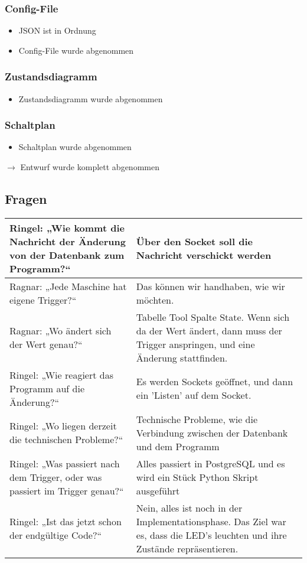\documentclass{scrartcl}
\begin{document}
\subsubsection{Config-File}
\begin{itemize}
	\item JSON ist in Ordnung
	\item Config-File wurde abgenommen
\end{itemize}

\subsubsection{Zustandsdiagramm}
\begin{itemize}
	\item Zustandsdiagramm wurde abgenommen
\end{itemize}

\subsubsection{Schaltplan}
\begin{itemize}
	\item Schaltplan wurde abgenommen
\end{itemize}

$\rightarrow$ Entwurf wurde komplett abgenommen

\subsection{Fragen}
\begin{center}
\begin{tabular}[t]{p{.45\linewidth} p{.45\linewidth}}
Ringel: „Wie kommt die Nachricht der Änderung von der Datenbank zum Programm?“ & Über den Socket soll die Nachricht verschickt werden \\
\hline
Ragnar: „Jede Maschine hat eigene Trigger?“ & Das können wir handhaben, wie wir möchten.\\
\hline
Ragnar: „Wo ändert sich der Wert genau?“ & Tabelle Tool Spalte State. Wenn sich da der Wert ändert, dann muss der Trigger anspringen, und eine Änderung stattfinden.\\
\hline
Ringel: „Wie reagiert das Programm auf die Änderung?“ & Es werden Sockets geöffnet, und dann ein 'Listen' auf dem Socket. \\
\hline
Ringel: „Wo liegen derzeit die technischen Probleme?“ & Technische Probleme, wie die Verbindung zwischen der Datenbank und dem Programm \\
\hline
Ringel: „Was passiert nach dem Trigger, oder was passiert im Trigger genau?“ & Alles passiert in PostgreSQL und es wird ein Stück Python Skript ausgeführt \\
\hline
Ringel: „Ist das jetzt schon der endgültige Code?“ & Nein, alles ist noch in der Implementationsphase. Das Ziel war es, dass die LED's leuchten und ihre Zustände repräsentieren. \\
\end{tabular}
\end{center}
\end{document}
